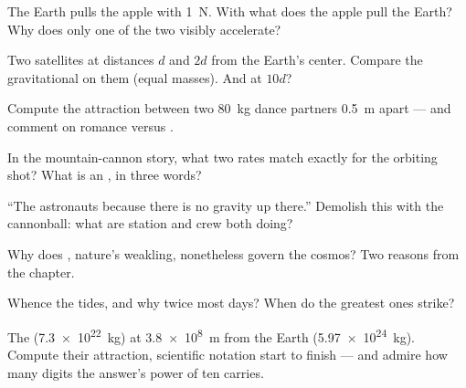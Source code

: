 \begin{exercise}[$\star$]\label{exo:g9:gravitation:2}
The Earth pulls the apple with \qty{1}{N}. With what 
does the apple pull the Earth? Why does only one of the two
visibly accelerate?
\end{exercise}

\begin{exercise}[$\star$]\label{exo:g9:gravitation:3}
Two satellites  at distances $d$ and $2d$ from the
Earth's center. Compare the gravitational  on them
(equal masses). And at $10 d$?
\end{exercise}

\begin{exercise}[$\star$]\label{exo:g9:gravitation:4}
Compute the attraction between two \qty{80}{kg} dance
partners \qty{0.5}{m} apart --- and comment on romance
versus .
\end{exercise}

\begin{exercise}[$\star$]\label{exo:g9:gravitation:5}
In the mountain-cannon story, what two rates match exactly
for the orbiting shot? What is an , in three words?
\end{exercise}

\begin{exercise}[$\star$]\label{exo:g9:gravitation:6}
``The astronauts  because there is no gravity up
there.'' Demolish this with the cannonball: what are station
and crew both doing?
\end{exercise}

\begin{exercise}[$\star$]\label{exo:g9:gravitation:7}
Why does , nature's weakling, nonetheless govern
the cosmos? Two reasons from the chapter.
\end{exercise}

\begin{exercise}[$\star$]\label{exo:g9:gravitation:8}
Whence the tides, and why twice most days? When do the
greatest ones strike?
\end{exercise}

\begin{exercise}[$\star\star$]\label{exo:g9:gravitation:9}
The  (\qty{7.3e22}{kg})  at \qty{3.8e8}{m} from
the Earth (\qty{5.97e24}{kg}). Compute their attraction,
scientific notation start to finish --- and admire how many
digits the answer's power of ten carries.
\end{exercise}

